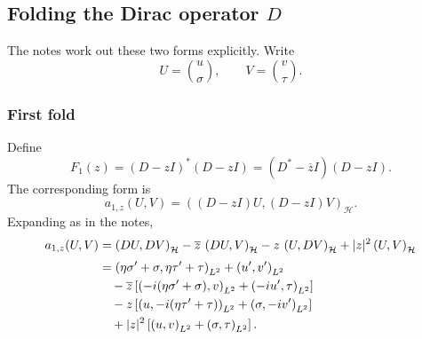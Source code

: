 \documentclass[12pt,a4paper]{article}
\newcommand{\D}{\mathcal{D}}
\newcommand{\ip}[2]{\left(#1,#2\right)_{L^2}}
\newcommand{\IP}[2]{\left(#1,#2\right)_{\mathcal H}}
\begin{document}


\subsection{Folding the Dirac operator $D$}

The notes work out these two forms explicitly.  Write
\[
    U=\binom{u}{\sigma},
    \qquad
    V=\binom{v}{\tau}.
\]

\subsubsection*{First fold}

Define
\begin{equation}
    F_{1}(z)
    =(D-zI)^*(D-zI)
    =(D^*-\overline z I)(D-zI).
\end{equation}
The corresponding form is
\begin{equation}
    a_{1, z}(U,V)
    =\IP{(D-zI)U}{(D-zI)V}.
\end{equation}
Expanding as in the notes,
\begin{align}
    a_{1, z}(U,V)
    &=\IP{DU}{DV}
      -\overline z\,\IP{DU}{V}
      -z\,\IP{U}{DV}
      +|z|^2\IP{U}{V}\\[0.3em]
    &=\ip{\eta\sigma'+\sigma}{\eta\tau'+\tau}
      +\ip{u'}{v'}\notag\\
    &\quad
      -\overline z\left[
        \ip{-i(\eta\sigma'+\sigma)}{v}
        +\ip{-iu'}{\tau}
      \right]\notag\\
    &\quad
      -z\left[
        \ip{u}{-i(\eta\tau'+\tau)}
        +\ip{\sigma}{-iv'}
      \right]\notag\\
    &\quad
      +|z|^2\left[
        \ip{u}{v}+\ip{\sigma}{\tau}
      \right].
    \label{eq:diracfold1}
\end{align}
\end{document}
